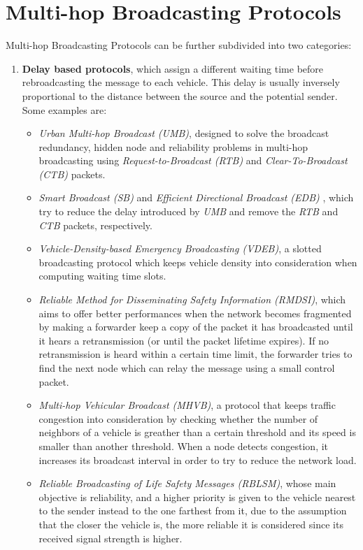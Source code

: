 	
	\section{Multi-hop Broadcasting Protocols}
		Multi-hop Broadcasting Protocols can be further subdivided into two categories:
		\begin{enumerate}
			\item \textbf{Delay based protocols}, which assign a different waiting time before rebroadcasting the message to each vehicle. This delay is usually inversely proportional to the distance between the source and the potential sender.
			Some examples are:
			\begin{itemize}
				\renewcommand\labelitemi{--}
				\item \textit{Urban Multi-hop Broadcast (UMB)}\cite{Korkmaz:2004:UMB:1023875.1023887}, designed to solve the broadcast redundancy, hidden node and reliability problems in multi-hop broadcasting using \textit{Request-to-Broadcast (\textit{RTB})} and \textit{Clear-To-Broadcast (\textit{CTB})} packets.
				\item \textit{Smart Broadcast (SB)}\cite{4025102} and \textit{Efficient Directional Broadcast (EDB)} \cite{4340158}, which try to reduce the delay introduced by \textit{UMB} and remove the \textit{RTB} and \textit{CTB} packets, respectively.
				\item \textit{Vehicle-Density-based Emergency Broadcasting (VDEB)}\cite{5663803}, a slotted broadcasting protocol which keeps vehicle density into consideration when computing waiting time slots.
				\item \textit{Reliable Method for Disseminating Safety Information
					(RMDSI)}\cite{4591259}, which aims to offer better performances when the network becomes fragmented by making a forwarder keep a copy of the packet it has broadcasted until it hears a retransmission (or until the packet lifetime expires). If no retransmission is heard within a certain time limit, the forwarder tries to find the next node which can relay the message using a small control packet.
				\item \textit{Multi-hop Vehicular Broadcast (MHVB)}\cite{4068699}, a protocol that keeps traffic congestion into consideration by   checking whether the number of neighbors of a vehicle is greather than a certain threshold and its speed is smaller than another threshold. When a node detects congestion, it increases its broadcast interval in order to try to reduce the network load.
				\item \textit{Reliable Broadcasting of Life Safety Messages (RBLSM)}\cite{4458046}, whose main objective is reliability, and a higher priority is given to the vehicle nearest to the sender instead to the one farthest from it, due to the assumption that the closer the vehicle is, the more reliable it is considered since its received signal strength is higher.
			\end{itemize}
			

\end{enumerate}
